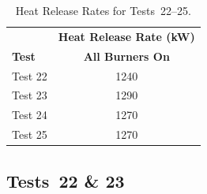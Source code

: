 \renewcommand{\baselinestretch}{1}
\begin{table}[!ht]
\caption{Heat Release Rates for Tests~22--25.}
\begin{center}
\begin{tabular}{lc}
 \toprule
					& 	\textbf{Heat Release Rate (kW)}	\\
\textbf{Test}		& 	\textbf{All Burners On} \\
 \midrule
Test 22				&     	1240 	  \\
Test 23				&     	1290 	  \\
Test 24				& 	    1270 	  \\
Test 25				&     	1270 	  \\
\bottomrule
\end{tabular}
\end{center}
\label{table:HRR_Tests_22-25}
\end{table}

\subsection{Tests~22 \& 23}

